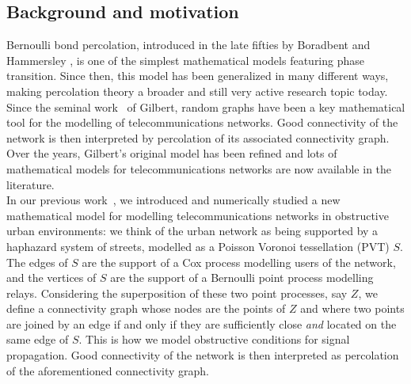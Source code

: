 \documentclass[10pt,a4paper]{amsart}
\theoremstyle{exampstyle}
\theoremstyle{exampnotations}
\begin{document}
\subsection{Background and motivation}
Bernoulli bond percolation, introduced in the late fifties by Boradbent and Hammersley \cite{broadbent1957percolation}, is one of the simplest mathematical models featuring phase transition. Since then, this model has been generalized in many different ways, making percolation theory a broader and still very active research topic today. 
\\ \indent Since the seminal work~\cite{gilbert1961random} of Gilbert, random graphs have been a key mathematical tool for the modelling of telecommunications networks. Good connectivity of the network is then interpreted by percolation of its associated connectivity graph. Over the years, Gilbert's original model has been refined and lots of mathematical models for telecommunications networks are now available in the literature.
\\ \indent In our previous work~\cite{LeGal1904:Influence}, we introduced and numerically studied a new mathematical model for modelling telecommunications networks in obstructive urban environments: we think of the urban network as being supported by a haphazard system of streets, modelled as a Poisson Voronoi tessellation (PVT) $S$. The edges of $S$ are the support of a Cox process modelling users of the network, and the vertices of $S$ are the support of a Bernoulli point process modelling relays. Considering the superposition of these %
two point processes, say $Z$, we define a connectivity graph whose nodes are the points of $Z$ and where two points are joined by an edge if and only if they are sufficiently close \emph{and} located on the same edge of $S$. This is how we model obstructive conditions for signal propagation. Good connectivity of the network is then interpreted as percolation of the aforementioned connectivity graph. \\
\end{document}

